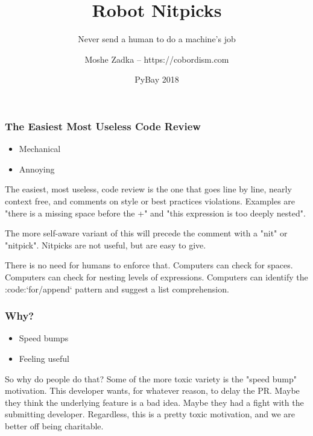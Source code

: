 \usepackage[utf8]{inputenc}
\usepackage{listings}
\usepackage{textcomp}

\title{Robot Nitpicks}
\subtitle{Never send a human to do a machine's job}
\author{Moshe Zadka -- https://cobordism.com}
\date{PyBay 2018}
 

 
\begin{titlepage}
\maketitle
\end{titlepage}

\frame{\titlepage}

\begin{frame}
\frametitle{The Easiest Most Useless Code Review}
\begin{itemize}
\item Mechanical
\item Annoying
\end{itemize}
\end{frame}

The easiest,
most useless,
code review is the one that goes line by line,
nearly context free,
and comments on style or best practices violations.
Examples are "there is a missing space before the +"
and "this expression is too deeply nested".

The more self-aware variant of this will precede the comment
with a "nit" or "nitpick".
Nitpicks are not useful,
but are easy to give.

There is no need for humans to enforce that.
Computers can check for spaces.
Computers can check for nesting levels of expressions.
Computers can identify the :code:`for/append`
pattern and suggest a list comprehension.

\begin{frame}
\frametitle{Why?}
\begin{itemize}
\item Speed bumps
\item Feeling useful
\end{itemize}
\end{frame}

So why do people do that?
Some of the more toxic variety is the
"speed bump" motivation.
This developer wants,
for whatever reason,
to delay the PR.
Maybe they think the underlying feature is a bad idea.
Maybe they had a fight with the submitting developer.
Regardless,
this is a pretty toxic motivation,
and we are better off being charitable.

